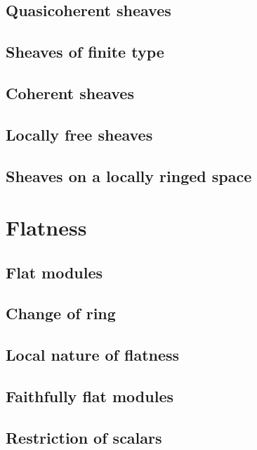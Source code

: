 \documentclass[10pt,oneside]{book}
\begin{document}
\subsection{Quasicoherent sheaves}
\label{0-prelim-5.1}

\subsection{Sheaves of finite type}
\label{0-prelim-5.2}

\subsection{Coherent sheaves}
\label{0-prelim-5.3}

\subsection{Locally free sheaves}
\label{0-prelim-5.4}

\subsection{Sheaves on a locally ringed space}
\label{0-prelim-5.5}

\section{Flatness}
\label{0-prelim-6}

\subsection{Flat modules}
\label{0-prelim-6.1}

\subsection{Change of ring}
\label{0-prelim-6.2}

\subsection{Local nature of flatness}
\label{0-prelim-6.3}

\subsection{Faithfully flat modules}
\label{0-prelim-6.4}

\subsection{Restriction of scalars}
\label{0-prelim-6.5}
\end{document}
